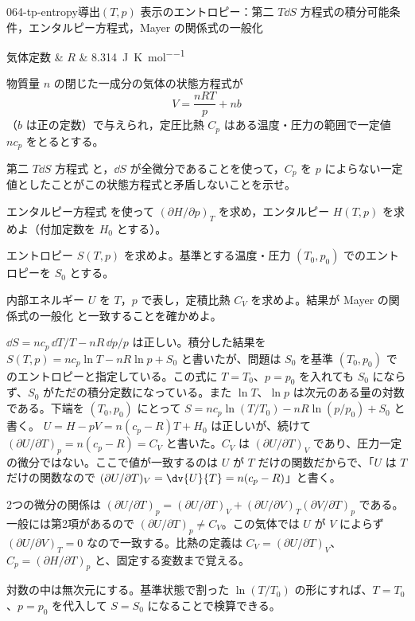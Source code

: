 \documentclass[uplatex,dvipdfmx,a4paper,11pt]{jsarticle}
\begin{document}
\begin{mondai}{064-tp-entropy}{導出}{$(T,p)$ 表示のエントロピー：第二 $T\dd S$ 方程式の積分可能条件，エンタルピー方程式，Mayer の関係式の一般化}
\begin{teisuu}
  気体定数 & $R$ & \qty{8.314}{\joule\per\kelvin\per\mole}\\
\end{teisuu}
物質量 $n$ の閉じた一成分の気体の状態方程式が
  \[ V = \frac{nRT}{p} + nb \]
  （$b$ は正の定数）で与えられ，定圧比熱 $C_{p}$ はある温度・圧力の範囲で一定値 $nc_{p}$ をとるとする。
  \begin{shoumon}
    \item 第二 $T\dd S$ 方程式  と，$\dd S$ が全微分であることを使って，$C_{p}$ を $p$ によらない一定値としたことがこの状態方程式と矛盾しないことを示せ。
    \item エンタルピー方程式  を使って $(\partial H/\partial p)_{T}$ を求め，エンタルピー $H(T,p)$ を求めよ（付加定数を $H_{0}$ とする）。
    \item エントロピー $S(T,p)$ を求めよ。基準とする温度・圧力 $(T_{0},p_{0})$ でのエントロピーを $S_{0}$ とする。
    \item 内部エネルギー $U$ を $T$，$p$ で表し，定積比熱 $C_{V}$ を求めよ。結果が Mayer の関係式の一般化  と一致することを確かめよ。
  \end{shoumon}

\begin{kotaeran}
   $\dd S=nc_{p}\,\dd T/T-nR\,\dd p/p$ は正しい。積分した結果を $S(T,p)=nc_{p}\ln T-nR\ln p+S_{0}$ と書いたが、問題は $S_{0}$ を基準 $(T_{0},p_{0})$ でのエントロピーと指定している。この式に $T=T_{0}$、$p=p_{0}$ を入れても $S_{0}$ にならず、$S_{0}$ がただの積分定数になっている。また $\ln T$、$\ln p$ は次元のある量の対数である。下端を $(T_{0},p_{0})$ にとって $S=nc_{p}\ln(T/T_{0})-nR\ln(p/p_{0})+S_{0}$ と書く。
   $U=H-pV=n(c_{p}-R)T+H_{0}$ は正しいが、続けて $(\partial U/\partial T)_{p}=n(c_{p}-R)=C_{V}$ と書いた。$C_{V}$ は $(\partial U/\partial T)_{V}$ であり、圧力一定の微分ではない。ここで値が一致するのは $U$ が $T$ だけの関数だからで、「$U$ は $T$ だけの関数なので $(\partial U/\partial T)_{V}=\dv{U}{T}=n(c_{p}-R)$」と書く。
\end{kotaeran}
\begin{rikai}
  \item 2つの微分の関係は $(\partial U/\partial T)_{p}=(\partial U/\partial T)_{V}+(\partial U/\partial V)_{T}(\partial V/\partial T)_{p}$ である。一般には第2項があるので $(\partial U/\partial T)_{p}\neq C_{V}$。この気体では $U$ が $V$ によらず $(\partial U/\partial V)_{T}=0$ なので一致する。比熱の定義は $C_{V}=(\partial U/\partial T)_{V}$、$C_{p}=(\partial H/\partial T)_{p}$ と、固定する変数まで覚える。
  \item 対数の中は無次元にする。基準状態で割った $\ln(T/T_{0})$ の形にすれば、$T=T_{0}$、$p=p_{0}$ を代入して $S=S_{0}$ になることで検算できる。
\end{rikai}
\end{mondai}
\end{document}
